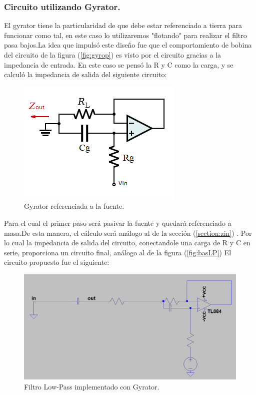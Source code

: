 \documentclass[a4paper]{article}
\begin{document}
\subsubsection{Circuito utilizando Gyrator.}
El gyrator tiene la particularidad de que debe estar referenciado a tierra para funcionar como tal, en este caso lo utilizaremos "flotando" para realizar el filtro pasa bajos.La idea que impulsó este diseño fue que el comportamiento de bobina del circuito de la figura (\ref{fig:gyrop}) es visto por el circuito gracias a la impedancia de entrada. En este caso se pensó la R y C como la carga, y se calculó la impedancia de salida del siguiente circuito:

\begin{figure}[H]	
	\centering
	\includegraphics[width=\textwidth]{ImagenesEj2/gyrfloat.png}
	\caption{Gyrator referenciada a la fuente.}
	\label{fig:gyrfloat}
\end{figure}
Para el cual el primer paso será pasivar la fuente y quedará referenciado a masa.De esta manera, el cálculo será análogo al de la sección (\ref{section:zin}) . Por lo cual la impedancia de salida del circuito, conectandole una carga de R y C en serie, proporciona un circuito final, análogo al de la figura (\ref{fig:basLP})
El circuito propuesto fue el siguiente:
\begin{figure}[H]	
	\centering
	\includegraphics[width=\textwidth]{ImagenesEj2/gyrLP.PNG}
	\caption{Filtro Low-Pass implementado con Gyrator.}
	\label{fig:gyrLP}
\end{figure}
\end{document}
